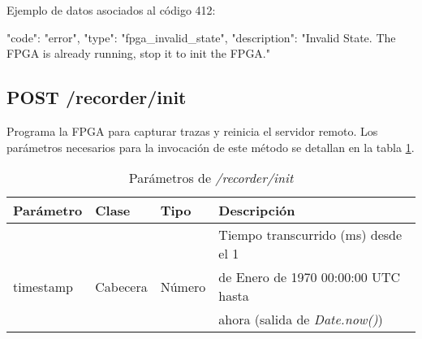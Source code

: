 \begin{itemize}
{\begin{minipage}{\textwidth}
Ejemplo de datos asociados al código 412:

\begin{code}[language=json]
{
  "code": "error",
  "type": "fpga_invalid_state",
  "description": "Invalid State. The FPGA is already running, stop it to init the FPGA."
}
\end{code}
\end{minipage}
}

\end{itemize}

%
%
\subsection{POST /recorder/init}

Programa la \gls{FPGA} para capturar \glspl{traza} y reinicia el servidor remoto. Los parámetros necesarios para la invocación de este método se detallan en la tabla \ref{extra:api:recorderinit:invocacion}.

\begin{table}[H]
\centering
\begin{tabular}{|l|l|l|l|}
\hline
\rowcolor[HTML]{F5F5F5}
\textbf{Parámetro}  & \textbf{Clase} & \textbf{Tipo} & \textbf{Descripción}                  \\ \hline
                    &                &               & Tiempo transcurrido (ms) desde el 1   \\
timestamp           & Cabecera       & Número        & de Enero de 1970 00:00:00 UTC hasta   \\
                    &                &               & ahora (salida de \textit{Date.now()}) \\ \hline
\end{tabular}
\caption{Parámetros de \textit{/recorder/init}}
\label{extra:api:recorderinit:invocacion}
\end{table}

